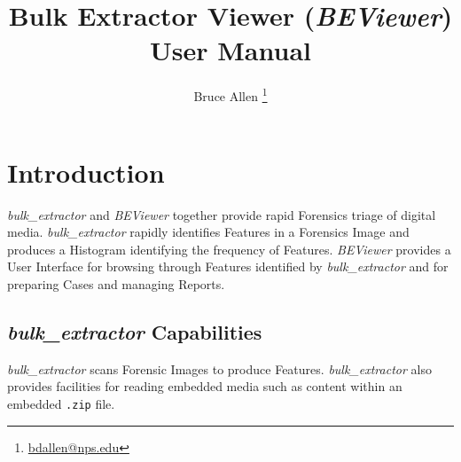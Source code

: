 \documentclass[10pt,twoside]{article}
\newcommand{\bulk}{\emph{bulk\_extractor}\xspace}
\newcommand{\bev}{\emph{BEViewer}\xspace}
\begin{document}

\title{Bulk Extractor Viewer (\bev) User Manual}
\author{Bruce Allen \footnote{\href{mailto:bdallen@nps.edu}{bdallen@nps.edu}}}
\maketitle


\cleardoublepage
\setcounter{tocdepth}{2}
\tableofcontents
\cleardoublepage

\section{Introduction}
\bulk and \bev together provide rapid Forensics triage of digital media.
\bulk rapidly identifies \glspl{Feature} in a Forensics \gls{Image}
and produces a \gls{Histogram} identifying the frequency of Features.
\bev provides a User Interface for browsing through Features identified by \bulk
and for preparing \glspl{Case} and managing \glspl{Report}.

\subsection{\bulk Capabilities}
\bulk scans Forensic \glspl{Image} to produce \glspl{Feature}.
\bulk also provides facilities for reading embedded media
such as content within an embedded \texttt{.zip} file.
\end{document}
